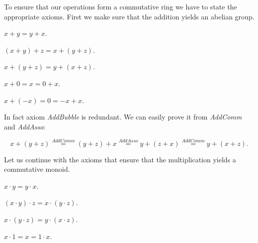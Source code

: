 \documentclass{article}
\begin{document}
  To ensure that our operations form a commutative ring we have to state the appropriate axioms. First we make sure that the addition yields an abelian group.

  \begin{forthel}
    \begin{axiom}[AddComm]
      $x + y = y + x$.
    \end{axiom}

    \begin{axiom}[AddAsso]
      $(x + y) + z = x + (y + z)$.
    \end{axiom}

    \begin{axiom}[AddBubble]
      $x + (y + z) = y + (x + z)$.
    \end{axiom}

    \begin{axiom}[AddZero]
      $x + 0 = x = 0 + x$.
    \end{axiom}

    \begin{axiom}[AddInvr]
      $x + (-x) = 0 = -x + x$.
    \end{axiom}
  \end{forthel}

  In fact axiom \textit{AddBubble} is redundant. We can easily prove it from \textit{AddComm} and \textit{AddAsso}:

  \[
    x + (y + z) \overset{AddComm}{=} (y + z) + x \overset{AddAsso}{=} y + (z + x) \overset{AddComm}{=} y + (x + z).
  \]

  Let us continue with the axioms that ensure that the multiplication yields a commutative monoid.

  \begin{forthel}
    \begin{axiom}[MulComm]
      $x \cdot y = y \cdot x$.
    \end{axiom}

    \begin{axiom}[MulAsso]
      $(x \cdot y) \cdot z = x \cdot (y \cdot z)$.
    \end{axiom}

    \begin{axiom}[MulBubble]
      $x \cdot (y \cdot z) = y \cdot (x \cdot z)$.
    \end{axiom}

    \begin{axiom}[MulUnit]
      $x \cdot 1 = x = 1 \cdot x$.
    \end{axiom}
  \end{forthel}
\end{document}

